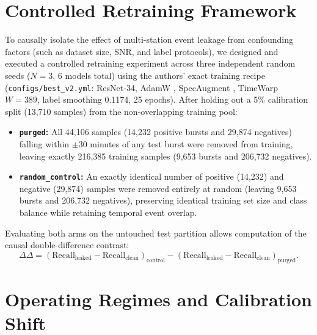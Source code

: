 \documentclass[11pt,a4paper]{article}
\begin{document}
\section{Controlled Retraining Framework}

To causally isolate the effect of multi-station event leakage from confounding factors (such as dataset size, SNR, and label protocols), we designed and executed a controlled retraining experiment across three independent random seeds ($N=3$, 6 models total) using the authors' exact training recipe (\texttt{configs/best\_v2.yml}: ResNet-34, AdamW \cite{loshchilov2019adamw}, SpecAugment \cite{park2019specaugment}, TimeWarp $W=389$, label smoothing 0.1174, 25 epochs). After holding out a 5\% calibration split (13,710 samples) from the non-overlapping training pool:
\begin{itemize}
    \item \textbf{\texttt{purged}:} All 44,106 samples (14,232 positive bursts and 29,874 negatives) falling within $\pm 30$ minutes of any test burst were removed from training, leaving exactly 216,385 training samples (9,653 bursts and 206,732 negatives).
    \item \textbf{\texttt{random\_control}:} An exactly identical number of positive (14,232) and negative (29,874) samples were removed entirely at random (leaving 9,653 bursts and 206,732 negatives), preserving identical training set size and class balance while retaining temporal event overlap.
\end{itemize}

Evaluating both arms on the untouched test partition allows computation of the causal double-difference contrast:
\begin{equation}
\Delta\Delta = (\text{Recall}_{\text{leaked}} - \text{Recall}_{\text{clean}})_{\text{control}} - (\text{Recall}_{\text{leaked}} - \text{Recall}_{\text{clean}})_{\text{purged}}.
\end{equation}

\section{Operating Regimes and Calibration Shift}
\end{document}
